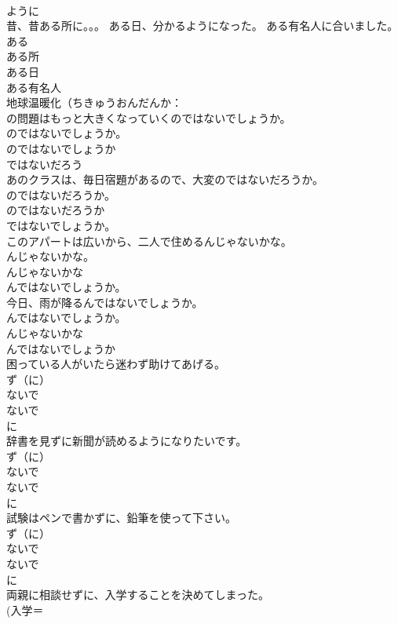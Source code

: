 \documentclass[8pt]{extreport}
\begin{document}
\begin{CJK}{UTF8}{min}
{\\	ように 
\\	昔、昔ある所に。。。 ある日、分かるようになった。 ある有名人に合いました。	
\\	ある
\\	ある所 
\\	ある日 
\\	ある有名人 
\\	地球温暖化（ちきゅうおんだんか：
\\	の問題はもっと大きくなっていくのではないでしょうか。	
\\	のではないでしょうか。 
\\	のではないでしょうか 
\\	ではないだろう 
\\	あのクラスは、毎日宿題があるので、大変のではないだろうか。	
\\	のではないだろうか。 
\\	のではないだろうか 
\\	ではないでしょうか。 
\\	このアパートは広いから、二人で住めるんじゃないかな。	
\\	んじゃないかな。 
\\	んじゃないかな 
\\	んではないでしょうか。
\\	今日、雨が降るんではないでしょうか。	
\\	んではないでしょうか。 
\\	んじゃないかな 
\\	んではないでしょうか
\\	困っている人がいたら迷わず助けてあげる。	
\\	ず（に） 
\\	ないで 
\\	ないで 
\\	に 
\\	辞書を見ずに新聞が読めるようになりたいです。	
\\	ず（に） 
\\	ないで 
\\	ないで 
\\	に 
\\	試験はペンで書かずに、鉛筆を使って下さい。	
\\	ず（に） 
\\	ないで 
\\	ないで 
\\	に 
\\	両親に相談せずに、入学することを決めてしまった。	
\\	(入学＝
}
\end{CJK}
\end{document}

